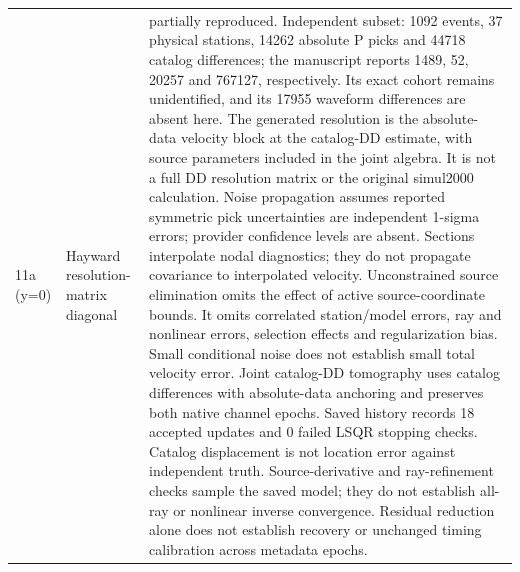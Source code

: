 \begin{longtable}{>{\raggedright\arraybackslash}p{}>{\raggedright\arraybackslash}p{}>{\raggedright\arraybackslash}p{}}
11a (y=0) & Hayward resolution-matrix diagonal & partially reproduced. Independent subset: 1092 events, 37 physical stations, 14262 absolute P picks and 44718 catalog differences; the manuscript reports 1489, 52, 20257 and 767127, respectively. Its exact cohort remains unidentified, and its 17955 waveform differences are absent here. The generated resolution is the absolute-data velocity block at the catalog-DD estimate, with source parameters included in the joint algebra. It is not a full DD resolution matrix or the original simul2000 calculation. Noise propagation assumes reported symmetric pick uncertainties are independent 1-sigma errors; provider confidence levels are absent. Sections interpolate nodal diagnostics; they do not propagate covariance to interpolated velocity. Unconstrained source elimination omits the effect of active source-coordinate bounds. It omits correlated station/model errors, ray and nonlinear errors, selection effects and regularization bias. Small conditional noise does not establish small total velocity error. Joint catalog-DD tomography uses catalog differences with absolute-data anchoring and preserves both native channel epochs. Saved history records 18 accepted updates and 0 failed LSQR stopping checks. Catalog displacement is not location error against independent truth. Source-derivative and ray-refinement checks sample the saved model; they do not establish all-ray or nonlinear inverse convergence. Residual reduction alone does not establish recovery or unchanged timing calibration across metadata epochs.\\

\end{longtable}

